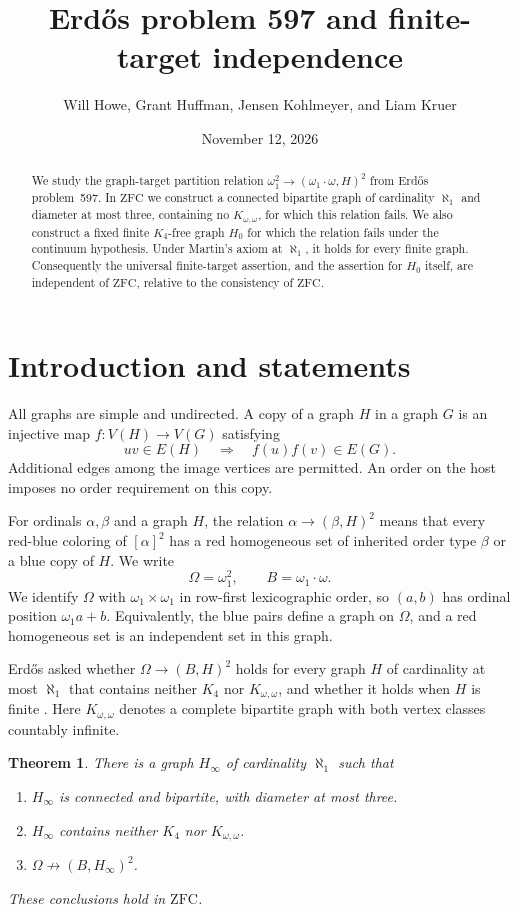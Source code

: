 \documentclass[10pt,letterpaper,leqno]{amsart}
\title[Erd\H{o}s problem 597 and finite-target independence]{Erd\H{o}s problem 597 and finite-target independence}
\author[W. Howe, G. Huffman, J. Kohlmeyer, and L. Kruer]{Will Howe, Grant Huffman, Jensen Kohlmeyer, and Liam Kruer}
\date{November 12, 2026}
\numberwithin{equation}{section}
\newtheorem{theorem}{Theorem}[section]
\theoremstyle{definition}
\theoremstyle{remark}
\newcommand{\Om}{\omega_1^2}
\newcommand{\Bl}{\omega_1\cdot\omega}
\newcommand{\ZFC}{\mathrm{ZFC}}
\begin{document}
\begin{abstract}
We study the graph-target partition relation
$\omega_1^2\to(\omega_1\cdot\omega,H)^2$ from Erd\H{o}s problem~597.
In $\ZFC$ we construct a connected bipartite graph of cardinality $\aleph_1$
and diameter at most three, containing no $K_{\omega,\omega}$, for which this
relation fails. We also construct a fixed finite $K_4$-free graph $H_0$ for
which the relation fails under the continuum hypothesis. Under Martin's
axiom at $\aleph_1$, it holds for every finite graph. Consequently the
universal finite-target assertion, and the assertion for $H_0$ itself, are
independent of $\ZFC$, relative to the consistency of $\ZFC$.
\end{abstract}
\maketitle

\section{Introduction and statements}

All graphs are simple and undirected. A copy of a graph $H$ in a graph $G$
is an injective map $f\colon V(H)\to V(G)$ satisfying
\[
 uv\in E(H)\quad\Longrightarrow\quad f(u)f(v)\in E(G).
\]
Additional edges among the image vertices are permitted. An order on the
host imposes no order requirement on this copy.

For ordinals $\alpha,\beta$ and a graph $H$, the relation
$\alpha\to(\beta,H)^2$ means that every red-blue coloring of $[\alpha]^2$
has a red homogeneous set of inherited order type $\beta$ or a blue copy
of $H$. We write
\[
 \Omega=\Om,\qquad B=\Bl.
\]
We identify $\Omega$ with $\omega_1\times\omega_1$ in row-first
lexicographic order, so $(a,b)$ has ordinal position $\omega_1a+b$.
Equivalently, the blue pairs define a graph on $\Omega$, and a red
homogeneous set is an independent set in this graph.

Erd\H{o}s asked whether $\Omega\to(B,H)^2$ holds for every graph $H$ of
cardinality at most $\aleph_1$ that contains neither $K_4$ nor
$K_{\omega,\omega}$, and whether it holds when $H$ is finite
\cite{Erdos}. Here $K_{\omega,\omega}$ denotes a complete bipartite graph
with both vertex classes countably infinite.

\begin{theorem}\label{thm:infinite}
There is a graph $H_\infty$ of cardinality $\aleph_1$ such that
\begin{enumerate}[label=\textup{(\roman*)},leftmargin=2.3em]
\item $H_\infty$ is connected and bipartite, with diameter at most three.
\item $H_\infty$ contains neither $K_4$ nor $K_{\omega,\omega}$.
\item $\Omega\not\to(B,H_\infty)^2$.
\end{enumerate}
These conclusions hold in $\ZFC$.
\end{theorem}
\end{document}
